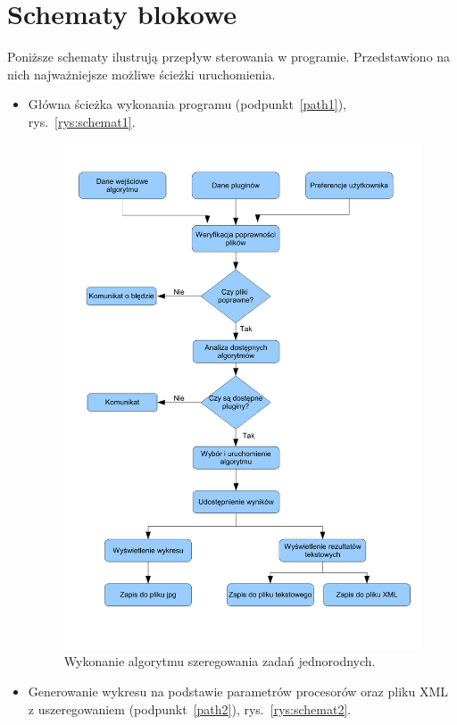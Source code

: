 \section{Schematy blokowe}

Poniższe schematy ilustrują przepływ sterowania w programie. Przedstawiono na nich najważniejsze możliwe ścieżki uruchomienia.

\begin{itemize}
	\item Główna ścieżka wykonania programu (podpunkt~\vref{path1}), rys.~\vref{rys:schemat1}.
		\begin{figure}[p]
		\centering\includegraphics[scale=0.55]{figures/schemat1.pdf}
		\caption{Wykonanie algorytmu szeregowania zadań jednorodnych.}\label{rys:schemat1}
		\end{figure}
	\item Generowanie wykresu na podstawie parametrów procesorów oraz pliku XML z uszeregowaniem (podpunkt~\vref{path2}), rys.~\vref{rys:schemat2}.

\end{itemize}

